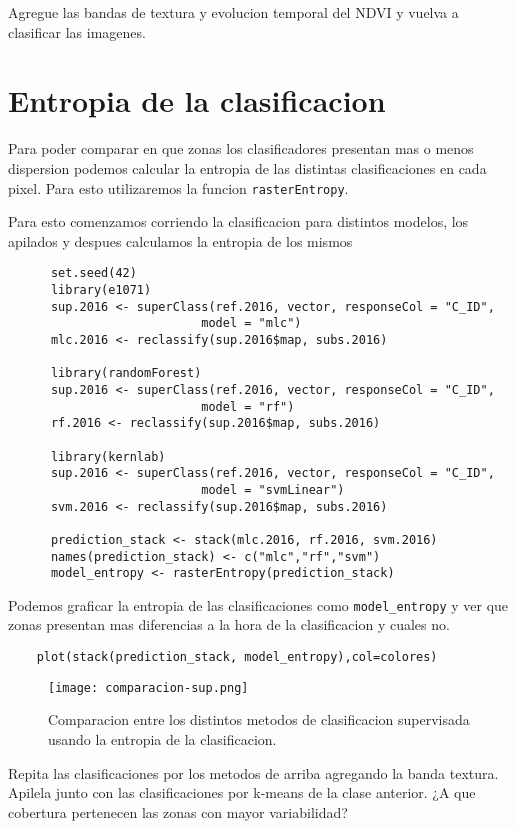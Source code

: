 \begin{act}
    Agregue las bandas de textura y evolucion temporal del NDVI y vuelva a clasificar las imagenes.
\end{act}

\section{Entropia de la clasificacion}

Para poder comparar en que zonas los clasificadores presentan mas o menos dispersion podemos calcular la entropia de las distintas clasificaciones en cada pixel. Para esto utilizaremos la funcion \texttt{rasterEntropy}.

\begin{exa}
  Para esto comenzamos corriendo la clasificacion para distintos modelos, los apilados y
  despues calculamos la entropia de los mismos

  \begin{lstlisting}
      set.seed(42)
      library(e1071)
      sup.2016 <- superClass(ref.2016, vector, responseCol = "C_ID",
                           model = "mlc")
      mlc.2016 <- reclassify(sup.2016$map, subs.2016)

      library(randomForest)
      sup.2016 <- superClass(ref.2016, vector, responseCol = "C_ID",
                           model = "rf")
      rf.2016 <- reclassify(sup.2016$map, subs.2016)

      library(kernlab)
      sup.2016 <- superClass(ref.2016, vector, responseCol = "C_ID",
                           model = "svmLinear")
      svm.2016 <- reclassify(sup.2016$map, subs.2016)

      prediction_stack <- stack(mlc.2016, rf.2016, svm.2016)
      names(prediction_stack) <- c("mlc","rf","svm")
      model_entropy <- rasterEntropy(prediction_stack)
  \end{lstlisting}

  Podemos graficar la entropia de las clasificaciones como \verb|model_entropy| y ver que zonas presentan mas diferencias a la hora de la clasificacion y cuales no.
  \begin{lstlisting}
    plot(stack(prediction_stack, model_entropy),col=colores)
  \end{lstlisting}
\end{exa}
  \begin{figure}[h!]
    \centering
    \texttt{[image: comparacion-sup.png]}
    \caption{Comparacion entre los distintos metodos de clasificacion supervisada usando la entropia de la clasificacion.}
    \label{fig:entropia}
  \end{figure}
\begin{act}
  Repita las clasificaciones por los metodos de arriba agregando la banda textura. Apilela junto con las clasificaciones por k-means de la clase anterior. ¿A que cobertura pertenecen las zonas con mayor variabilidad?
\end{act}
